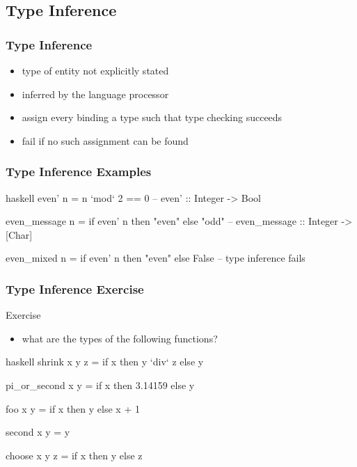\documentclass[dvipsnames]{beamer}
\theoremstyle{plain}
\begin{document}
\subsection{Type Inference}

\begin{frame}
  \frametitle{Type Inference}

  \begin{itemize}
    \item type of entity not explicitly stated
    \item inferred by the language processor

    \pause
    \medskip
    \item assign every binding a type such that type checking succeeds
    \item fail if no such assignment can be found
  \end{itemize}
\end{frame}

\begin{frame}[fragile]
  \frametitle{Type Inference Examples}

  \begin{example}[Haskell]
    \begin{pygments}{haskell}
even' n = n `mod` 2 == 0
-- even' :: Integer -> Bool

even_message n = if even' n then "even" else "odd"
-- even_message :: Integer -> [Char]

even_mixed n = if even' n then "even" else False
-- type inference fails
    \end{pygments}
  \end{example}
\end{frame}

\begin{frame}[fragile]
  \frametitle{Type Inference Exercise}

  \begin{block}{Exercise}
    \begin{itemize}
      \item what are the types of the following functions?
    \end{itemize}

    \medskip
    \begin{pygments}{haskell}
shrink x y z = if x then y `div` z else y

pi_or_second x y = if x then 3.14159 else y

foo x y = if x then y else x + 1

second x y = y

choose x y z = if x then y else z
    \end{pygments}
  \end{block}
\end{frame}
\end{document}

